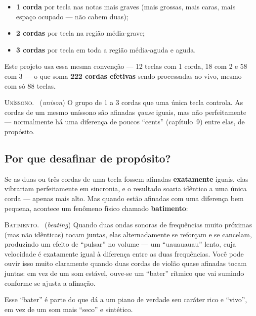 \documentclass[11pt,oneside]{book}
\newcommand{\nova}[1]{\textsc{\color{accent}#1.}~}
\begin{document}
\begin{itemize}
\item \textbf{1 corda} por tecla nas notas mais graves (mais grossas, mais
caras, mais espaço ocupado --- não cabem duas);
\item \textbf{2 cordas} por tecla na região média-grave;
\item \textbf{3 cordas} por tecla em toda a região média-aguda e aguda.
\end{itemize}

Este projeto usa essa mesma convenção --- 12 teclas com 1 corda, 18 com 2 e
58 com 3 --- o que soma \textbf{222 cordas efetivas} sendo processadas ao
vivo, mesmo com só 88 teclas.

\begin{newword}
\nova{Uníssono} (\emph{unison}) O grupo de 1 a 3 cordas que uma única
tecla controla. As cordas de um mesmo uníssono são afinadas \emph{quase}
iguais, mas não perfeitamente --- normalmente há uma diferença de poucos
\enquote{cents} (capítulo~9) entre elas, de propósito.
\end{newword}

\subsection*{Por que desafinar de propósito?}

Se as duas ou três cordas de uma tecla fossem afinadas \textbf{exatamente}
iguais, elas vibrariam perfeitamente em sincronia, e o resultado soaria
idêntico a uma única corda --- apenas mais alto. Mas quando estão afinadas
com uma diferença bem pequena, acontece um fenômeno físico chamado
\textbf{batimento}:

\begin{newword}
\nova{Batimento} (\emph{beating}) Quando duas ondas sonoras de frequências
muito próximas (mas não idênticas) tocam juntas, elas alternadamente se
reforçam e se cancelam, produzindo um efeito de \enquote{pulsar} no volume
--- um \enquote{uauauauau} lento, cuja velocidade é exatamente igual à
diferença entre as duas frequências. Você pode ouvir isso muito
claramente quando duas cordas de violão quase afinadas tocam juntas: em
vez de um som estável, ouve-se um \enquote{bater} rítmico que vai sumindo
conforme se ajusta a afinação.
\end{newword}

Esse \enquote{bater} é parte do que dá a um piano de verdade seu caráter
rico e \enquote{vivo}, em vez de um som mais \enquote{seco} e sintético.
\end{document}
